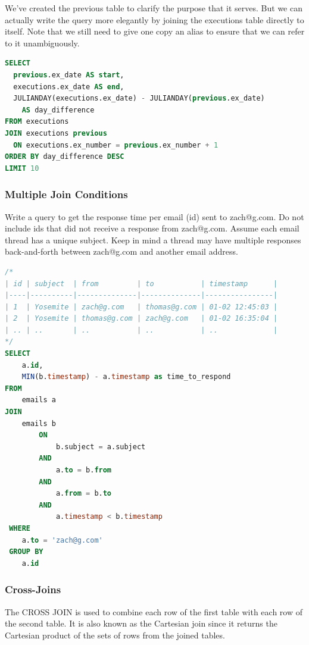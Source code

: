 \documentclass{article}
\begin{document}
We've created the previous table to clarify the purpose that it serves. But we can actually write the query more elegantly by joining the executions table directly to itself. Note that we still need to give one copy an alias to ensure that we can refer to it unambiguously.

\vspace{8pt} \begin{lstlisting}[language=SQL]
SELECT
  previous.ex_date AS start,
  executions.ex_date AS end,
  JULIANDAY(executions.ex_date) - JULIANDAY(previous.ex_date)
    AS day_difference
FROM executions
JOIN executions previous
  ON executions.ex_number = previous.ex_number + 1
ORDER BY day_difference DESC
LIMIT 10
\end{lstlisting} \vspace{8pt}

\subsubsection{Multiple Join Conditions}

Write a query to get the response time per email (id) sent to zach@g.com. Do not include ids that did not receive a response from zach@g.com. Assume each email thread has a unique subject. Keep in mind a thread may have multiple responses back-and-forth between zach@g.com and another email address. 

\vspace{8pt} \begin{lstlisting}[language=SQL]
/*
| id | subject  | from         | to           | timestamp      |
|----|----------|--------------|--------------|----------------|
| 1  | Yosemite | zach@g.com   | thomas@g.com | 01-02 12:45:03 |
| 2  | Yosemite | thomas@g.com | zach@g.com   | 01-02 16:35:04 |
| .. | ..       | ..           | ..           | ..             |
*/
SELECT 
    a.id, 
    MIN(b.timestamp) - a.timestamp as time_to_respond 
FROM 
    emails a 
JOIN
    emails b 
        ON 
            b.subject = a.subject 
        AND 
            a.to = b.from
        AND 
            a.from = b.to 
        AND 
            a.timestamp < b.timestamp 
 WHERE 
    a.to = 'zach@g.com' 
 GROUP BY 
    a.id 
\end{lstlisting}

\subsubsection{Cross-Joins}
The CROSS JOIN is used to combine each row of the first table with each row of the second table. It is also known as the Cartesian join since it returns the Cartesian product of the sets of rows from the joined tables.
\end{document}
